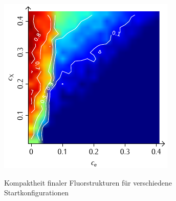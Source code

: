 \documentclass[a4paper, 10pt, twoside, openany]{book} %
\begin{document}
\begin{figure}
\begin{minipage}[t]{0.48\textwidth}
        \label{F_individual_K}
    \end{minipage}
    \hfill
    \begin{minipage}[t]{0.48\textwidth}
        \includegraphics[width=\textwidth]{Abbildungen/Phasendiagramme/Konturen/F_penalty_individual_K.pdf}
        \label{F_penalty_individual_K}
    \end{minipage}
    \caption[Kompaktheit finaler Fluorstrukturen]{Kompaktheit finaler Fluorstrukturen für verschiedene Startkonfigurationen}
    \label{F_K}
\end{figure}
\end{document}
